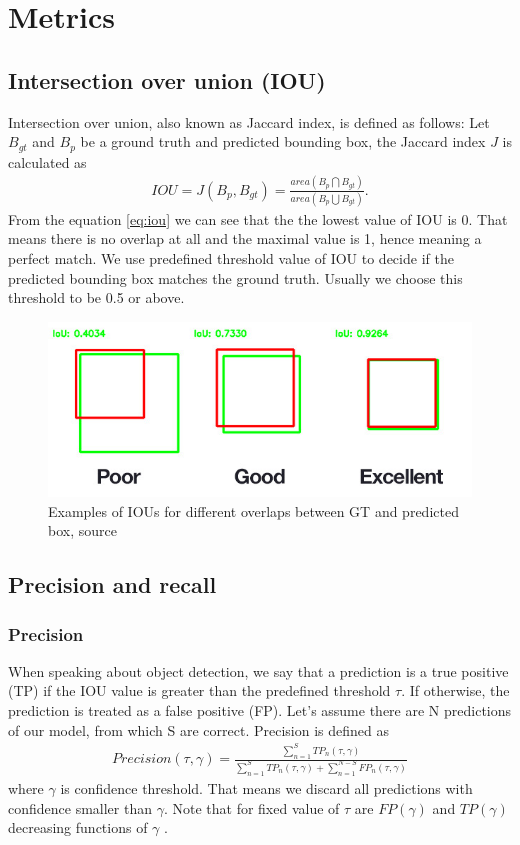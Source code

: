 \section{Metrics}
\subsection{Intersection over union (IOU) }
Intersection over union, also known as Jaccard index, is defined as follows: Let $B_{gt}$ and $B_p$ be a ground truth and predicted bounding box, the Jaccard index $J$ is calculated as
\begin{align}
    IOU = J(B_p, B_{gt}) = \frac{area(B_p \bigcap B_{gt})}{area(B_p \bigcup B_{gt})}.
    \label{eq:iou}
\end{align}
From the equation \ref{eq:iou} we can see that the the lowest value of IOU is 0. That means there is no overlap at all and the maximal value is 1, hence meaning a perfect match.
We use predefined threshold value of IOU to decide if the predicted bounding box matches the ground truth. Usually we choose this threshold to be 0.5 or above.

\begin{figure}
    \includegraphics[width = \linewidth]{images/IOU.jpg}
    \caption{Examples of IOUs for different overlaps between GT and predicted box, source \cite{Cowton2019}}
    \label{fig:iou}
\end{figure}

\subsection{Precision and recall}
\subsubsection{Precision}
\label{subsec:precision}
When speaking about object detection, we say that a prediction is a true positive (TP) if the IOU value is greater than the predefined threshold $\tau$. If otherwise, the prediction is treated as a false positive (FP). Let's assume there are N predictions of our model, from which S are correct. Precision is defined as
\begin{align}
    Precision(\tau, \gamma) = \frac{\sum_{n=1}^S TP_n(\tau, \gamma)}{\sum_{n=1}^S TP_n(\tau, \gamma) + \sum_{n=1}^{N-S} FP_n(\tau, \gamma)}
\end{align}
where $\gamma$ is confidence threshold. That means we discard all predictions with confidence smaller than $\gamma$. Note that for fixed value of $\tau$ are $FP(\gamma)$ and $TP(\gamma)$ decreasing functions of $\gamma$ \cite{Padilla2021}.

